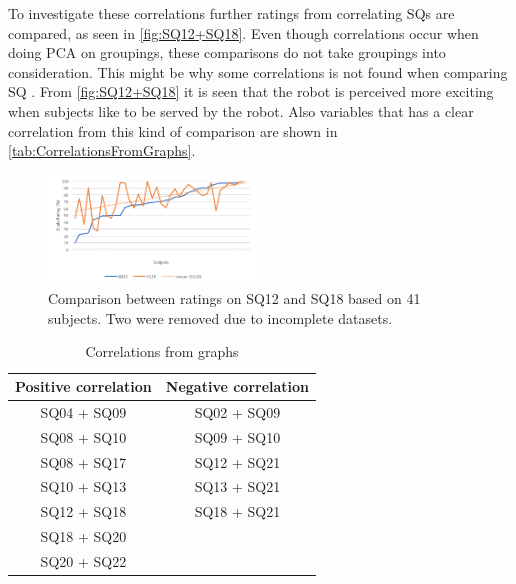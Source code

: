 To investigate these correlations further ratings from correlating SQs are compared, as seen in \autoref{fig:SQ12+SQ18}. Even though correlations occur when doing PCA on groupings, these comparisons do not take groupings into consideration. This might be why some correlations is not found when comparing SQ . From \autoref{fig:SQ12+SQ18} it is seen that the robot is perceived more exciting when subjects like to be served by the robot. Also variables that has a clear correlation from this kind of comparison are shown in \autoref{tab:CorrelationsFromGraphs}.
%
\begin{figure}[H]
	\centering
	\includegraphics[width = 0.49\textwidth]{Figure/SQ12+SQ18}
	\setlength{} 
	\caption{Comparison between ratings on SQ12 and SQ18 based on 41 subjects. Two were removed due to incomplete datasets.}
	\label{fig:SQ12+SQ18}
\end{figure}
\noindent
%
\begin{table}
	\centering
	\caption{Correlations from graphs}
	\label{tab:CorrelationsFromGraphs} 
	\begin{tabular}{ c|c }
		\centering
		Positive correlation & Negative correlation \\ \hline
		SQ04 + SQ09 & SQ02 + SQ09 \\ 
		SQ08 + SQ10 & SQ09 + SQ10 \\ 
		SQ08 + SQ17 & SQ12 + SQ21 \\ 
		SQ10 + SQ13 & SQ13 + SQ21 \\ 
		SQ12 + SQ18 & SQ18 + SQ21	\\	
		SQ18 + SQ20 & 							\\
		SQ20 + SQ22 & 
	\end{tabular}        
\end{table}
\noindent
%

